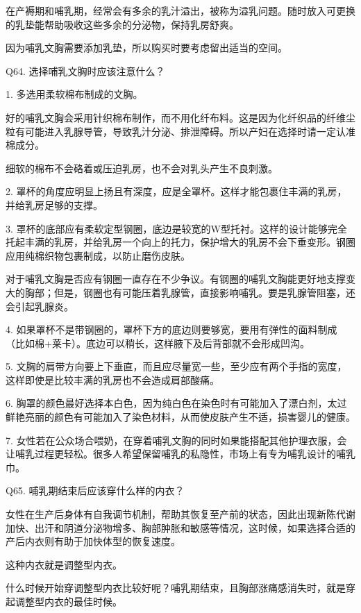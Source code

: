 \documentclass[12pt,UTF8]{ctexbook}
\begin{document}
在产褥期和哺乳期，经常会有多余的乳汁溢出，被称为溢乳问题。随时放入可更换的乳垫能帮助吸收这些多余的分泌物，保持乳房舒爽。

因为哺乳文胸需要添加乳垫，所以购买时要考虑留出适当的空间。





Q64. 选择哺乳文胸时应该注意什么？


1. 多选用柔软棉布制成的文胸。

好的哺乳文胸会采用针织棉布制作，而不用化纤布料。这是因为化纤织品的纤维尘粒有可能进入乳腺导管，导致乳汁分泌、排泄障碍。所以产妇在选择时请一定认准棉成分。

细软的棉布不会硌着或压迫乳房，也不会对乳头产生不良刺激。


2. 罩杯的角度应明显上扬且有深度，应是全罩杯。这样才能包裹住丰满的乳房，并给乳房足够的支撑。


3. 罩杯的底部应有柔软定型钢圈，底边是较宽的W型托衬。这样的设计能够完全托起丰满的乳房，并给乳房一个向上的托力，保护增大的乳房不会下垂变形。钢圈应用纯棉织物包裹制成，以防止磨伤皮肤。

对于哺乳文胸是否应有钢圈一直存在不少争议。有钢圈的哺乳文胸能更好地支撑变大的胸部；但是，钢圈也有可能压着乳腺管，直接影响哺乳。要是乳腺管阻塞，还会引起乳腺炎。


4. 如果罩杯不是带钢圈的，罩杯下方的底边则要够宽，要用有弹性的面料制成（比如棉+莱卡）。底边可以稍长，这样腋下及后背部就不会形成凹沟。


5. 文胸的肩带方向要上下垂直，而且应尽量宽一些，至少应有两个手指的宽度，这样即使是比较丰满的乳房也不会造成肩部酸痛。


6. 胸罩的颜色最好选择本白色，因为纯白色在染色时有可能加入了漂白剂，太过鲜艳亮丽的颜色有可能加入了染色材料，从而使皮肤产生不适，损害婴儿的健康。


7. 女性若在公众场合喂奶，在穿着哺乳文胸的同时如果能搭配其他护理衣服，会让哺乳过程更轻松。很多人希望保留哺乳的私隐性，市场上有专为哺乳设计的哺乳巾。





Q65. 哺乳期结束后应该穿什么样的内衣？


女性在生产后身体有自我调节机制，帮助其恢复至产前的状态，因此出现新陈代谢加快、出汗和阴道分泌物增多、胸部肿胀和敏感等情况，这时候，如果选择合适的产后内衣则有助于加快体型的恢复速度。

这种内衣就是调整型内衣。

什么时候开始穿调整型内衣比较好呢？哺乳期结束，且胸部涨痛感消失时，就是穿起调整型内衣的最佳时候。
\end{document}
